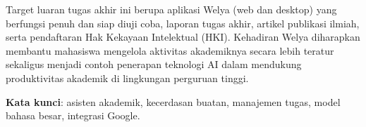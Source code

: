 \begin{singlespace}
  Target luaran tugas akhir ini berupa aplikasi Welya (web dan desktop)
  yang berfungsi penuh dan siap diuji coba, laporan tugas akhir, artikel
  publikasi ilmiah, serta pendaftaran Hak Kekayaan Intelektual (HKI).
  Kehadiran Welya diharapkan membantu mahasiswa mengelola aktivitas
  akademiknya secara lebih teratur sekaligus menjadi contoh penerapan
  teknologi AI dalam mendukung produktivitas akademik di lingkungan
  perguruan tinggi.

  \vspace{0.5em}
  \noindent\textbf{Kata kunci}: asisten akademik, kecerdasan buatan,
  manajemen tugas, model bahasa besar, integrasi Google.
\end{singlespace}
\clearpage
